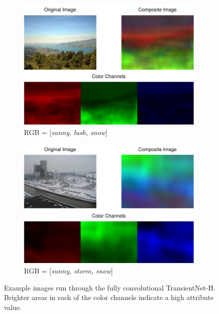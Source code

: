 \documentclass[10pt,twocolumn,letterpaper]{article}
\begin{document}
\begin{figure}
  \centering
  \begin{subfigure}[b]{0.49\textwidth}
    \centering
		\includegraphics[width=\textwidth]{figs/false_color_7371.pdf}
    \caption{RGB = [\textit{sunny, lush, snow}]}
    \label{fig:false_color_1}
  \end{subfigure}
  \begin{subfigure}[b]{0.49\textwidth}
    \centering
		\includegraphics[width=\textwidth]{figs/false_color_82.pdf}
    \caption{RGB = [\textit{sunny, storm, snow}]}
    \label{fig:false_color_2}
  \end{subfigure}
  \caption{Example images run through the fully convolutional TransientNet-H.
           Brighter areas in each of the color channels indicate a high
           attribute value.}
  \label{fig:false_color_ims}
\end{figure}
\end{document}
